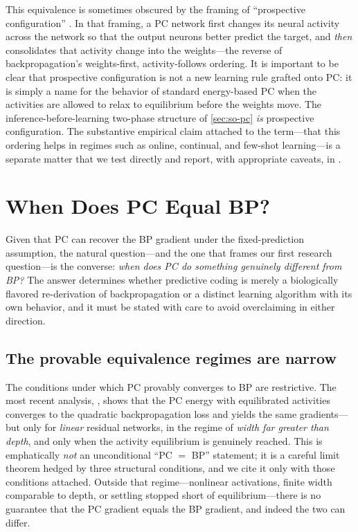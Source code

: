 This equivalence is sometimes obscured by the framing of ``prospective configuration''
\citep{song2024prospective}. In that framing, a PC network first changes its neural activity
across the network so that the output neurons better predict the target, and \emph{then}
consolidates that activity change into the weights---the reverse of backpropagation's
weights-first, activity-follows ordering. It is important to be clear that prospective
configuration is not a new learning rule grafted onto PC: it is simply a name for the behavior of
standard energy-based PC when the activities are allowed to relax to equilibrium before the weights
move. The inference-before-learning two-phase structure of \cref{sec:so-pc} \emph{is} prospective
configuration. The substantive empirical claim attached to the term---that this ordering helps in
regimes such as online, continual, and few-shot learning---is a separate matter that we test
directly and report, with appropriate caveats, in .

\section{When Does PC Equal BP?}

Given that PC can recover the BP gradient under the fixed-prediction assumption, the natural
question---and the one that frames our first research question---is the converse: \emph{when does
PC do something genuinely different from BP?} The answer determines whether predictive coding is
merely a biologically flavored re-derivation of backpropagation or a distinct learning algorithm
with its own behavior, and it must be stated with care to avoid overclaiming in either direction.

\subsection{The provable equivalence regimes are narrow}

The conditions under which PC provably converges to BP are restrictive. The most recent analysis,
\citet{innocenti2026limits}, shows that the PC energy with equilibrated activities converges to
the quadratic backpropagation loss and yields the same gradients---but only for \emph{linear}
residual networks, in the regime of \emph{width far greater than depth}, and only when the
activity equilibrium is genuinely reached. This is emphatically \emph{not} an unconditional
``PC $=$ BP'' statement; it is a careful limit theorem hedged by three structural conditions, and
we cite it only with those conditions attached. Outside that regime---nonlinear activations,
finite width comparable to depth, or settling stopped short of equilibrium---there is no guarantee
that the PC gradient equals the BP gradient, and indeed the two can differ.

